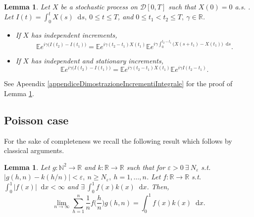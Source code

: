 \documentclass[12pt, twoside, english, headsepline]{article}
\newcommand*\dif{\mathop{}\!\mathrm{d}}  %
\newtheorem{lemma}[theorem]{Lemma}
\theoremstyle{definition} %
\numberwithin{equation}{section} %
\begin{document}
\begin{lemma}\label{lemmaIncrementiIntegraleProcesso}
	Let $X$ be a stochastic process on $\mathcal{D}[0,T]$ such that $X(0) =0$ a.s.%
	. Let $I(t) = \int_0^t X(s)\dif s,\ 0\le t\le T$, and $0\le t_1<t_2\le T, \ \gamma \in\mathbb{R}$.
	\begin{itemize}
		\item[($i$)] If $X$ has independent increments,
		\begin{equation}\label{incrementoIntegraleProcessoStocasticoIncrementiIndipendenti}
			\mathbb{E}e^{i\gamma \big(I(t_2)-I(t_1)\big)} = \mathbb{E}e^{i\gamma (t_2-t_1)X(t_1)}\mathbb{E}e^{i\gamma \int_0^{t_2-t_1} \big(X(s+t_1)-X(t_1)\big)\dif s}.
		\end{equation}
		\item[($ii$)] If $X$ has independent and stationary increments,
		\begin{equation}\label{incrementoIntegraleProcessoStocasticoIncrementiIndipendentiStazionario}
			\mathbb{E}e^{i\gamma \big(I(t_2)-I(t_1)\big)} = \mathbb{E}e^{i\gamma (t_2-t_1)X(t_1)}\mathbb{E}e^{i\gamma I(t_2-t_1)}.
		\end{equation}
	\end{itemize}
\end{lemma}
See Apeendix \ref{appendiceDimostrazioneIncrementiIntegrale} for the proof of Lemma \ref{lemmaIncrementiIntegraleProcesso}.





\subsection{Poisson case}

For the sake of completeness we recall the following result which follows by classical arguments.

\begin{lemma}\label{lemmaLimiteSerieRappresentanteIntegrale}
	Let $g:\mathbb{N}^2\longrightarrow \mathbb{R}$ and $k:\mathbb{R}\longrightarrow\mathbb{R}$ such that for $\varepsilon >0\ \exists\ N_\varepsilon$ s.t. $|g(h,n) - k(h/n)|<\varepsilon,\ n\ge N_\varepsilon,\ h=1,\dots, n$. Let $f:\mathbb{R}\longrightarrow\mathbb{R}$ s.t. $\int_0^1 |f(x)|\dif x<\infty$ and $\exists\ \int_0^1 f(x)k(x)\dif x$. Then, 
	\begin{equation*}
		\lim_{n\rightarrow\infty} \sum_{h=1}^n \frac{1}{n}f\Big(\frac{h}{n}\Big) g(h,n) = \int_0^1f(x)k(x)\dif x.
	\end{equation*}
\end{lemma}
\end{document}
